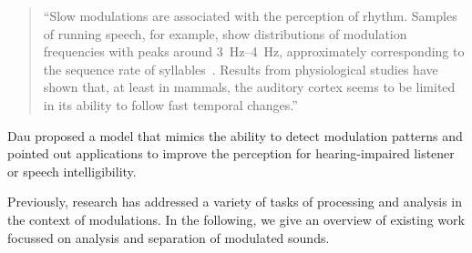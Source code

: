 \begin{quote}
``Slow modulations are associated with the perception of rhythm. Samples of running speech, for example, show distributions of modulation frequencies with peaks around \SIrange{3}{4}{\hertz}, approximately corresponding to the sequence rate of syllables~\cite{plomp83}. Results from physiological studies have shown that, at least in mammals, the auditory cortex seems to be limited in its ability to follow fast temporal changes.''
\end{quote}

Dau proposed a model that mimics the ability to detect modulation patterns and pointed out applications to improve the perception for hearing-impaired listener or speech intelligibility.
\par
Previously, research has addressed a variety of tasks of processing and analysis in the context of modulations.
In the following, we give an overview of existing work focussed on analysis and separation of modulated sounds.

